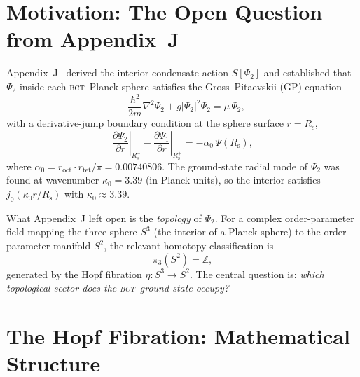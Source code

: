 \documentclass[aps,prl,preprint,superscriptaddress,floatfix]{revtex4-2}
\newcommand{\roct}{r_{\mathrm{oct}}}
\newcommand{\rtet}{r_{\mathrm{tet}}}
\newcommand{\az}{\alpha_0}
\newcommand{\BCT}{\textsc{bct}}
\newcommand{\Psiint}{\Psi_2}
\newcommand{\Psiext}{\Psi_1}
\newcommand{\Rsph}{R_{\mathrm{s}}}
\newcommand{\kz}{\kappa_0}
\begin{document}
\maketitle

\section{Motivation: The Open Question from Appendix~J}
\label{sec:motivation}

Appendix~J~\cite{AppJ} derived the interior condensate action
$S[\Psiint]$ and established that $\Psiint$ inside each \BCT\ Planck
sphere satisfies the Gross--Pitaevskii (GP) equation
\begin{equation}
  -\frac{\hbar^2}{2m}\nabla^2\Psiint + g|\Psiint|^2\Psiint
  = \mu\,\Psiint,
  \label{eq:GP}
\end{equation}
with a derivative-jump boundary condition at the sphere surface $r=\Rsph$,
\begin{equation}
  \left.\frac{\partial\Psiint}{\partial r}\right|_{\Rsph^-}
  -
  \left.\frac{\partial\Psiext}{\partial r}\right|_{\Rsph^+}
  = -\az\,\Psi(\Rsph),
  \label{eq:BC}
\end{equation}
where $\az = \roct\cdot\rtet/\pi = 0.00740806$.
The ground-state radial mode of $\Psiint$ was found at wavenumber
$\kz = 3.39$ (in Planck units), so the interior satisfies
$j_0(\kz r/\Rsph)$ with $\kz\approx 3.39$.

What Appendix~J left open is the \emph{topology} of $\Psiint$.
For a complex order-parameter field mapping the three-sphere $S^3$ (the
interior of a Planck sphere) to the order-parameter manifold $S^2$,
the relevant homotopy classification is
\begin{equation}
  \pi_3(S^2) = \mathbb{Z},
  \label{eq:homotopy}
\end{equation}
generated by the Hopf fibration $\eta: S^3\to S^2$.
The central question is: \emph{which topological sector does the \BCT\
ground state occupy?}

\section{The Hopf Fibration: Mathematical Structure}
\label{sec:hopf}
\end{document}
